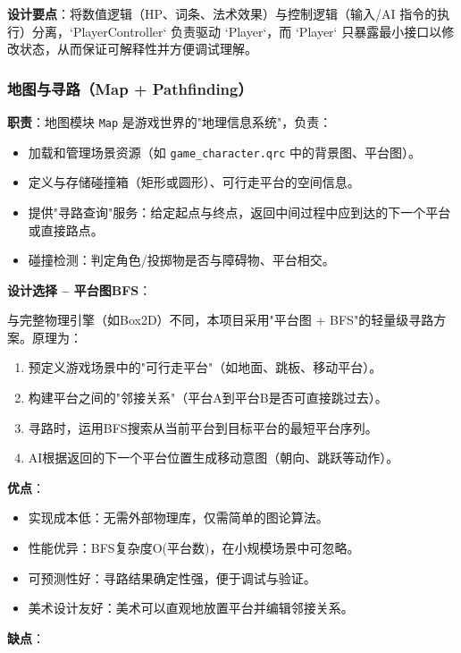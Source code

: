 ﻿\documentclass[utf8]{ctexart}
\begin{document}
\textbf{设计要点}：将数值逻辑（HP、词条、法术效果）与控制逻辑（输入/AI 指令的执行）分离，`PlayerController` 负责驱动 `Player`，而 `Player` 只暴露最小接口以修改状态，从而保证可解释性并方便调试理解。


\subsubsection{地图与寻路（Map + Pathfinding）}

\textbf{职责}：地图模块 \texttt{Map} 是游戏世界的"地理信息系统"，负责：

\begin{itemize}
  \item 加载和管理场景资源（如 \texttt{game\_character.qrc} 中的背景图、平台图）。
  \item 定义与存储碰撞箱（矩形或圆形）、可行走平台的空间信息。
  \item 提供"寻路查询"服务：给定起点与终点，返回中间过程中应到达的下一个平台或直接路点。
  \item 碰撞检测：判定角色/投掷物是否与障碍物、平台相交。
\end{itemize}

\textbf{设计选择 -- 平台图BFS}：

与完整物理引擎（如Box2D）不同，本项目采用"平台图 + BFS"的轻量级寻路方案。原理为：

\begin{enumerate}
  \item 预定义游戏场景中的"可行走平台"（如地面、跳板、移动平台）。
  \item 构建平台之间的"邻接关系"（平台A到平台B是否可直接跳过去）。
  \item 寻路时，运用BFS搜索从当前平台到目标平台的最短平台序列。
  \item AI根据返回的下一个平台位置生成移动意图（朝向、跳跃等动作）。
\end{enumerate}

\textbf{优点}：

\begin{itemize}
  \item 实现成本低：无需外部物理库，仅需简单的图论算法。
  \item 性能优异：BFS复杂度O(平台数)，在小规模场景中可忽略。
  \item 可预测性好：寻路结果确定性强，便于调试与验证。
  \item 美术设计友好：美术可以直观地放置平台并编辑邻接关系。
\end{itemize}

\textbf{缺点}：
\end{document}
